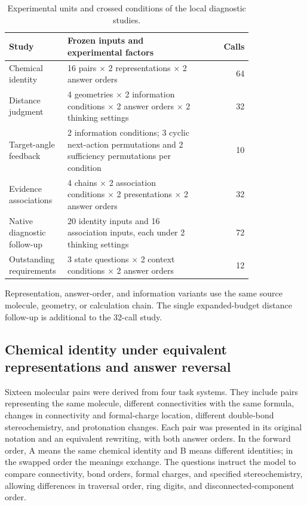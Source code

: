 \begin{table}[!htbp]
\centering\small
\caption{Experimental units and crossed conditions of the local diagnostic studies.}
\label{tab:si-diagnostic-design}
\begin{tabular}{p{0.24\linewidth}p{0.57\linewidth}r}
\toprule
Study & Frozen inputs and experimental factors & Calls\\
\midrule
Chemical identity & 16 pairs $\times$ 2 representations $\times$ 2 answer orders & 64\\
Distance judgment & 4 geometries $\times$ 2 information conditions $\times$ 2 answer orders $\times$ 2 thinking settings & 32\\
Target-angle feedback & 2 information conditions; 3 cyclic next-action permutations and 2 sufficiency permutations per condition & 10\\
Evidence associations & 4 chains $\times$ 2 association conditions $\times$ 2 presentations $\times$ 2 answer orders & 32\\
Native diagnostic follow-up & 20 identity inputs and 16 association inputs, each under 2 thinking settings & 72\\
Outstanding requirements & 3 state questions $\times$ 2 context conditions $\times$ 2 answer orders & 12\\
\bottomrule
\end{tabular}
\par\smallskip\begin{minipage}{\linewidth}\footnotesize
Representation, answer-order, and information variants use the same source molecule, geometry, or calculation chain. The single expanded-budget distance follow-up is additional to the 32-call study.
\end{minipage}
\end{table}

\subsection{Chemical identity under equivalent representations and answer reversal}

Sixteen molecular pairs were derived from four task systems. They include pairs representing the same molecule, different connectivities with the same formula, changes in connectivity and formal-charge location, different double-bond stereochemistry, and protonation changes. Each pair was presented in its original notation and an equivalent rewriting, with both answer orders. In the forward order, A means the same chemical identity and B means different identities; in the swapped order the meanings exchange. The questions instruct the model to compare connectivity, bond orders, formal charges, and specified stereochemistry, allowing differences in traversal order, ring digits, and disconnected-component order.

